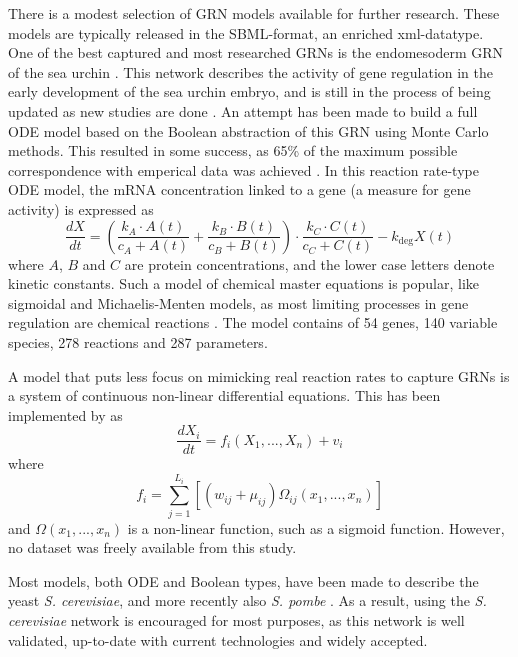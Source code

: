 \documentclass[../main.tex]{subfiles}
\begin{document}
There is a modest selection of GRN models available for further research.
These models are typically released in the SBML-format, an enriched xml-datatype.
One of the best captured and most researched GRNs is the endomesoderm GRN of the sea urchin \cite{bolouri2002modeling, kuhn2009monte}.
This network describes the activity of gene regulation in the early development of the sea urchin embryo, and is still in the process of being updated as new studies are done \cite{urchinmodel}.
An attempt has been made to build a full ODE model based on the Boolean abstraction of this GRN using Monte Carlo methods.
This resulted in some success, as 65\% of the maximum possible correspondence with emperical data was achieved \cite{kuhn2009monte}.
In this reaction rate-type ODE model, the mRNA concentration linked to a gene (a measure for gene activity) is expressed as
%
\begin{equation}
\frac{dX}{dt} = (\frac{k_A \cdot A\left( t \right)}{c_A + A\left( t \right)} + \frac{k_B \cdot B\left( t \right)}{c_B + B\left( t \right)}) \cdot \frac{k_C \cdot C\left( t \right)}{c_C + C\left( t \right)} - k_\mathrm{deg} X\left( t \right)
\end{equation}
%
where $A$, $B$ and $C$ are protein concentrations, and the lower case letters denote kinetic constants.
Such a model of chemical master equations is popular, like sigmoidal and Michaelis-Menten models, as most limiting processes in gene regulation are chemical reactions \cite{aijo2009learning}.
The model contains of 54 genes, 140 variable species, 278 reactions and 287 parameters.

A model that puts less focus on mimicking real reaction rates to capture GRNs is a system of continuous non-linear differential equations.
This has been implemented by \cite{qian2008inference} as
%
\begin{equation}
\frac{dX_i}{dt} = f_i \left( X_1,...,X_n \right) + v_i
\end{equation}
%
where
%
\begin{equation}
f_i = \sum_{j=1}^{L_i} [(w_{ij}+ \mu_{ij})\Omega_{ij}\left( x_1,...,x_n\right)]
\end{equation}
%
and $\Omega\left( x_1,...,x_n\right)$ is a non-linear function, such as a sigmoid function.
However, no dataset was freely available from this study.

Most models, both ODE and Boolean types, have been made to describe the yeast \textit{S. cerevisiae}, and more recently also \textit{S. pombe} \cite{ferrell2011modeling}.
As a result, using the \textit{S. cerevisiae} network is encouraged for most purposes, as this network is well validated, up-to-date with current technologies and widely accepted.
\end{document}
